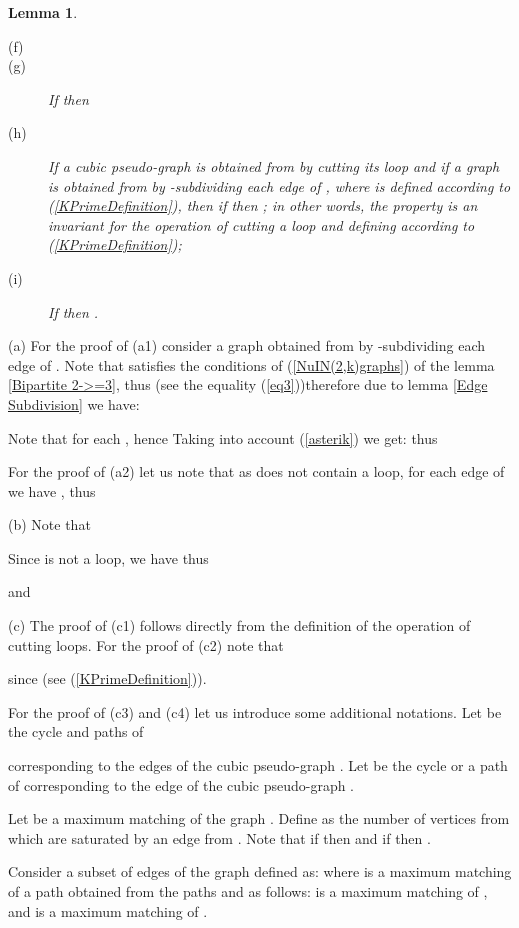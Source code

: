 \documentclass[fleqn,12pt,twoside]{article}
\newtheorem{lemma}{Lemma}
\newenvironment{proof}[1][Proof.]{\begin{trivlist}
\item[\hskip \labelsep {\bfseries #1}]}{\end{trivlist}}
\begin{document}
\begin{lemma}
\begin{description}
\item[(f)] 

\item[(g)] If  then 

\item[(h)] If a cubic pseudo-graph  is obtained from 
by cutting its loop  and if a graph  is obtained from  by -subdividing each edge  of , where 
is defined according to (\ref{KPrimeDefinition}), then if  then ; in other words, the
property  is an invariant
for the operation of cutting a loop and defining  according to (\ref{KPrimeDefinition});

\item[(i)] If  then .
\end{description}
\end{lemma}

\begin{proof}
(a) For the proof of (a1) consider a graph  obtained from  by -subdividing each edge of . Note that
 satisfies the conditions of (\ref{NuIN(2,k)graphs}) of
the lemma \ref{Bipartite 2->=3}, thus (see
the equality (\ref{eq3}))therefore due to lemma \ref{Edge Subdivision} we have:

Note that for each  , hence
Taking into account (\ref{asterik}) we get:
thus


For the proof of (a2) let us note that as  does not contain a
loop, for each edge  of  we have , thus


(b) Note that

Since  is not a loop, we have  thus

and


(c) The proof of (c1) follows directly from the definition of the
operation of cutting loops. For the proof of (c2) note that

since  (see (\ref{KPrimeDefinition})).

For the proof of (c3) and (c4) let us introduce some additional
notations. Let  be the cycle and paths of

corresponding to the edges  of the cubic pseudo-graph . Let  be the cycle or a path of  corresponding to
the edge  of the cubic pseudo-graph .

Let  be a maximum matching of the graph . Define
 as the number of vertices from
 which
are saturated by an edge from . Note that if  then  and if  then .

Consider a subset of edges of the graph  defined as:
where  is a maximum matching of a path  obtained
from the paths  and  as follows:
 is a maximum matching of , and  is a maximum matching of .


\end{proof}
\end{document}
